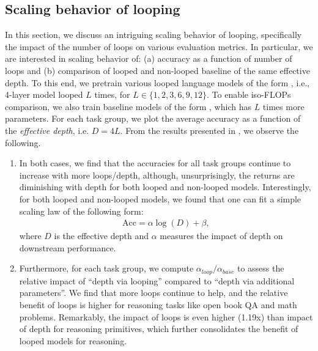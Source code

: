{\subsection{Scaling behavior of looping}
\label{sec:depth_scaling}






In this section, we discuss an intriguing scaling behavior of looping, specifically the impact of the number of loops on various evaluation metrics. In particular, we are interested in scaling behavior of: (a) accuracy as a function of number of loops and (b) comparison of looped and non-looped baseline of the same effective depth.
To this end, we pretrain various looped language models of the form , i.e., 4-layer model looped $L$ times, for $L \in \{1, 2, 3, 6, 9, 12\}$.
To enable iso-FLOPs comparison, we also train baseline models of the form , which has $L$ times more parameters.
For each task group, we plot the average accuracy as a function of the \emph{effective depth}, i.e. $D = 4L$.
From the results presented in , we observe the following.
\begin{enumerate}[leftmargin=.15in, itemsep=1ex]
    \item In both cases, we find that the accuracies for all task groups continue to increase with more loops/depth, although, unsurprisingly, the returns are diminishing with depth for both looped and non-looped models. Interestingly, for both looped and non-looped models, we found that one can fit a simple scaling law of the following form:
\begin{align}
    \text{Acc} = \alpha \log(D) + \beta,
    \label{eq:depth_scaling_law}
\end{align}
where $D$ is the effective depth and $\alpha$ measures the impact of depth on downstream performance.
\item Furthermore, for each task group, we compute $\alpha_{loop}/\alpha_{base}$ to assess the relative impact of ``depth via looping'' compared to ``depth via additional parameters''.
We find that more loops continue to help, and the relative benefit of loops is higher for reasoning tasks like open book QA and math problems.
Remarkably, the impact of loops is even higher (1.19x) than impact of depth for reasoning primitives, which further consolidates the benefit of looped models for reasoning.


\end{enumerate}}
